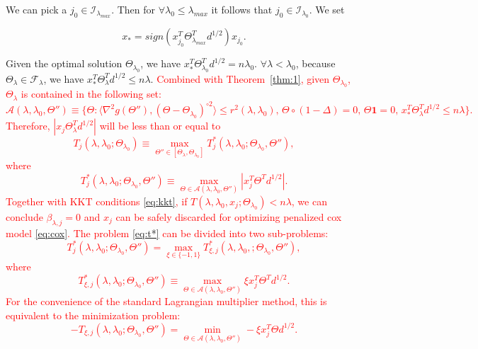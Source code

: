 \documentclass{article}
\providecommand{\note}[1]{\textcolor{red}{#1}}
\begin{document}
 We can pick a $j_0\in \mathcal{I}_{\lambda_{max}}$. Then for $\forall\lambda_0\leq\lambda_{max}$ it follows that $j_0\in\mathcal{I}_{\lambda_0}$. We set
 
 \begin{equation}
     x_*=sign\left(x_{j_0}^T\Theta_{\lambda_{max}}^Td^{1/2}\right)x_{j_0}.
 \end{equation}
 
 
 Given the optimal solution $\Theta_{\lambda_0}$, we have $x_*^T\Theta_{\lambda_0}^Td^{1/2}=n\lambda_0$. $\forall \lambda<\lambda_0$, because $\Theta_\lambda\in\mathcal{F}_\lambda$, we have $x_*^T\Theta_{\lambda}^Td^{1/2}\leq n\lambda$. \note{Combined with Theorem~\ref{thm:1}, given $\Theta_{\lambda_0}$, $\Theta_\lambda$ is contained in the following set:
 \begin{equation}
    \label{eq:boundset}
     \mathcal{A}(\lambda,{\lambda_0},\Theta'')\equiv\{\Theta:\langle\nabla^2 g(\Theta''),(\Theta-\Theta_{\lambda_0})^{\circ 2}\rangle\leq r^2(\lambda,\lambda_0),\,\Theta\circ(1-\Delta)=0,\, \Theta\mathbf{1}=0,\, x_*^T\Theta_{\lambda}^Td^{1/2}\leq n\lambda\}.
 \end{equation}
 Therefore, $\left|x_j\Theta_\lambda^T d^{1/2}\right|$ will be less than or equal to
 \begin{equation}  
    \label{eq:t}
     T_j(\lambda,\lambda_0;\Theta_{\lambda_0})\equiv\max_{\Theta''\in[\Theta_\lambda,\Theta_{\lambda_0}]}T^*_j(\lambda,\lambda_0;\Theta_{\lambda_0},\Theta''),
 \end{equation}
 where
 \begin{equation}
    \label{eq:t*}
     T^*_j(\lambda,\lambda_0;\Theta_{\lambda_0},\Theta'')\equiv\max_{\Theta\in\mathcal{A}(\lambda,{\lambda_0},\Theta'')} \left|x_j^T\Theta^T d^{1/2}\right|.
 \end{equation}
 Together with KKT conditions \eqref{eq:kkt}, if $T(\lambda,\lambda_0, x_j;\Theta_{\lambda_0})<n\lambda$, we can conclude $\beta_{\lambda,j}=0$ and $x_j$ can be safely discarded for optimizing penalized cox model \eqref{eq:cox}.
 The problem \eqref{eq:t*} can be divided into two sub-problems:
\begin{equation}
    T^*_j(\lambda,\lambda_0;\Theta_{\lambda_0},\Theta'')=\max_{\xi\in\{-1,1\}} T^*_{\xi, j}(\lambda,\lambda_0,;\Theta_{\lambda_0},\Theta''),
\end{equation}
where
\begin{equation}
    T^*_{\xi,j}(\lambda,\lambda_0;\Theta_{\lambda_0},\Theta'')\equiv\max_{\Theta\in\mathcal{A}(\lambda,{\lambda_0},\Theta'')} \xi x_j^T\Theta^T d^{1/2}.
\end{equation}
For the convenience of the standard Lagrangian multiplier method, this is equivalent to the minimization problem:
\begin{equation}
    \label{eq:bounddual}
    -T_{\xi,j}(\lambda,\lambda_0;\Theta_{\lambda_0},\Theta'')=\min_{\Theta\in\mathcal{A}(\lambda,{\lambda_0},\Theta'')} -\xi x_j^T\Theta d^{1/2}.
\end{equation}
}
\end{document}
